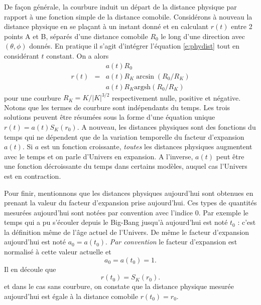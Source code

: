 De façon générale, la courbure induit un départ de la distance physique par rapport à une fonction simple de la distance comobile. Considérons à nouveau la distance physique en se plaçant à un instant donné et en calculant $r(t)$ entre 2 points A et B, séparés d'une distance comobile $R_0$ le long d'une direction avec $(\theta,\phi)$ donnés. En pratique il s'agit d'intégrer l'équation \ref{e:phydist} tout en considérant $t$ constant. On a alors
\begin{eqnarray}
&&a(t)R_0\\
r(t)&=&a(t)R_K \arcsin(R_0/R_K)\\
&&a(t)R_K \mathrm{argsh}(R_0/R_K)
\end{eqnarray}
pour une courbure $R_K=K/|K|^{3/2}$ respectivement nulle, positive et négative. Notons que les termes de courbure sont indépendants du temps. Les trois solutions peuvent être résumées sous la forme d'une équation unique $r(t)=a(t)S_K(r_0)$. A nouveau, les distances physiques sont des fonctions du temps qui ne dépendent que de la variation temporelle du facteur d'expansion $a(t)$. Si $a$ est un fonction croissante, \textit{toutes} les distances physiques augmentent avec le temps et on parle d'Univers en expansion. A l'inverse, $a(t)$ peut être une fonction décroissante du temps dans certains modèles, auquel cas l'Univers est en contraction.

Pour finir, mentionnons que les distances physiques aujourd'hui sont obtenues en prenant la valeur du facteur d'expansion prise aujourd'hui. Ces types de quantités mesurées aujourd'hui sont notées par convention avec l'indice 0. Par exemple le temps qui a pu s'écouler depuis le Big-Bang jusqu'à aujourd'hui est noté $t_0$ : c'est la définition même de l'âge actuel de l'Univers. De même le facteur d'expansion aujourd'hui est noté $a_0=a(t_0)$.
\textit{Par convention} le facteur d'expansion est normalisé à cette valeur actuelle et 
\begin{equation}
a_0=a(t_0)=1.
\end{equation}
Il en découle que 
\begin{equation}
r(t_0)=S_K(r_0).
\end{equation}
et dans le cas sans courbure, on constate que la distance physique mesurée aujourd'hui est égale à la distance comobile $r(t_0)=r_0$.

